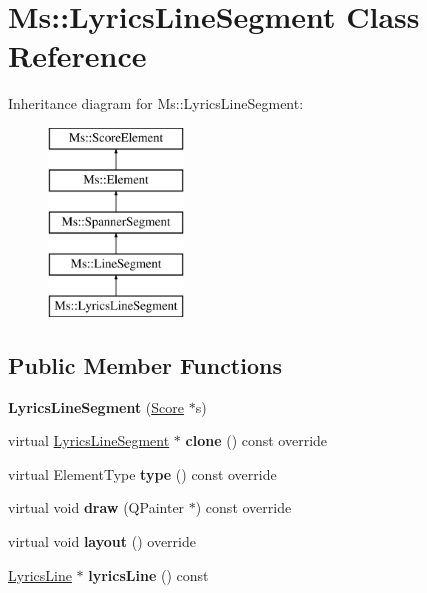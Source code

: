 \hypertarget{class_ms_1_1_lyrics_line_segment}{}\section{Ms\+:\+:Lyrics\+Line\+Segment Class Reference}
\label{class_ms_1_1_lyrics_line_segment}
Inheritance diagram for Ms\+:\+:Lyrics\+Line\+Segment\+:\begin{figure}[H]
\begin{center}
\leavevmode
\includegraphics[height=5.000000cm]{class_ms_1_1_lyrics_line_segment}
\end{center}
\end{figure}
\subsection*{Public Member Functions}
\begin{DoxyCompactItemize}
\item 
\mbox{\label{class_ms_1_1_lyrics_line_segment_af5da3553c38b84e5781aaf2478e2e241}} 
{\bfseries Lyrics\+Line\+Segment} (\hyperlink{class_ms_1_1_score}{Score} $\ast$s)
\item 
\mbox{\label{class_ms_1_1_lyrics_line_segment_ac4876bc4f9e57ebb85d188d3dcb28a46}} 
virtual \hyperlink{class_ms_1_1_lyrics_line_segment}{Lyrics\+Line\+Segment} $\ast$ {\bfseries clone} () const override
\item 
\mbox{\label{class_ms_1_1_lyrics_line_segment_a3fb740e7e8e52587d805efa9bfe96ca2}} 
virtual Element\+Type {\bfseries type} () const override
\item 
\mbox{\label{class_ms_1_1_lyrics_line_segment_ac64ef912ec0edc85714d2682785ff38e}} 
virtual void {\bfseries draw} (Q\+Painter $\ast$) const override
\item 
\mbox{\label{class_ms_1_1_lyrics_line_segment_a94998767527e78a241f9ab6b7efbc9d6}} 
virtual void {\bfseries layout} () override
\item 
\mbox{\label{class_ms_1_1_lyrics_line_segment_addd40997476172059ec7fd8123a16ff6}} 
\hyperlink{class_ms_1_1_lyrics_line}{Lyrics\+Line} $\ast$ {\bfseries lyrics\+Line} () const
\end{DoxyCompactItemize}
